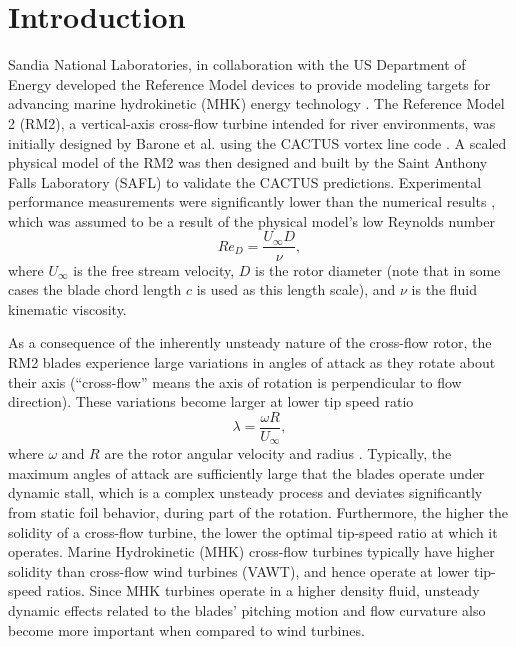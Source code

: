 \documentclass[10pt,letterpaper]{article}
\begin{document}
\section*{Introduction}

Sandia National Laboratories, in collaboration with the US Department of Energy
developed the Reference Model devices to provide modeling targets for advancing
marine hydrokinetic (MHK) energy technology \cite{Neary2014}. The Reference
Model 2 (RM2), a vertical-axis cross-flow turbine intended for river
environments, was initially designed by Barone et al. \cite{Barone2011} using
the CACTUS vortex line code \cite{Murray2011}. A scaled physical model of the
RM2 was then designed and built by the Saint Anthony Falls Laboratory (SAFL) to
validate the CACTUS predictions. Experimental performance measurements were
significantly lower than the numerical results \cite{Hill2014}, which was
assumed to be a result of the physical model's low Reynolds number
\begin{equation}
    Re_D = \frac{U_\infty D}{\nu},
\label{eq:Re}
\end{equation}
where $U_\infty$ is the free stream velocity, $D$ is the rotor diameter (note
that in some cases the blade chord length $c$ is used as this length scale), and
$\nu$ is the fluid kinematic viscosity.

As a consequence of the inherently unsteady nature of the cross-flow rotor, the
RM2 blades experience large variations in angles of attack as they rotate about
their axis (``cross-flow'' means the axis of rotation is perpendicular to flow
direction). These variations become larger at lower tip speed ratio
\begin{equation}
    \lambda=\frac{\omega R}{U_\infty},
\end{equation}
where $\omega$ and $R$ are the rotor angular velocity and radius
\cite{Para2002}. Typically, the maximum angles of attack are sufficiently large
that the blades operate under dynamic stall, which is a complex unsteady process
and deviates significantly from static foil behavior, during part of the
rotation. Furthermore, the higher the solidity of a cross-flow turbine, the
lower the optimal tip-speed ratio at which it operates. Marine Hydrokinetic
(MHK) cross-flow turbines typically have higher solidity than cross-flow wind
turbines (VAWT), and hence operate at lower tip-speed ratios. Since MHK turbines
operate in a higher density fluid, unsteady dynamic effects related to the
blades' pitching motion and flow curvature also become more important when
compared to wind turbines.
\end{document}

